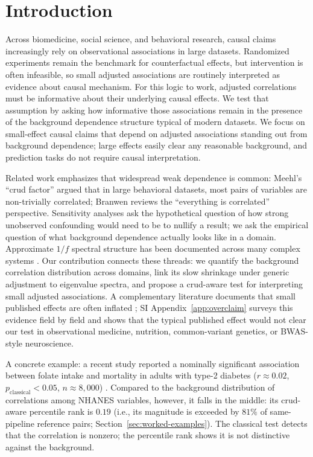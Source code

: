 \section{Introduction}

Across biomedicine, social science, and behavioral research, causal claims increasingly rely on observational associations in large datasets. Randomized experiments remain the benchmark for counterfactual effects, but intervention is often infeasible, so small adjusted associations are routinely interpreted as evidence about causal mechanism. For this logic to work, adjusted correlations must be informative about their underlying causal effects. We test that assumption by asking how informative those associations remain in the presence of the background dependence structure typical of modern datasets. We focus on small-effect causal claims that depend on adjusted associations standing out from background dependence; large effects easily clear any reasonable background, and prediction tasks do not require causal interpretation.

Related work emphasizes that widespread weak dependence is common: Meehl's ``crud factor'' \citep{meehl1990} argued that in large behavioral datasets, most pairs of variables are non-trivially correlated; Branwen \citep{gwernEverything} reviews the ``everything is correlated'' perspective. Sensitivity analyses \citep{cinelli2020,oster2019} ask the hypothetical question of how strong unobserved confounding would need to be to nullify a result; we ask the empirical question of what background dependence actually looks like in a domain. Approximate $1/f$ spectral structure has been documented across many complex systems \citep{press1978}. Our contribution connects these threads: we quantify the background correlation distribution across domains, link its slow shrinkage under generic adjustment to eigenvalue spectra, and propose a crud-aware test for interpreting small adjusted associations. A complementary literature documents that small published effects are often inflated \citep{ioannidis2005,gelman2014,osc2015}; SI Appendix~\ref{app:overclaim} surveys this evidence field by field and shows that the typical published effect would not clear our test in observational medicine, nutrition, common-variant genetics, or BWAS-style neuroscience.

A concrete example: a recent study reported a nominally significant association between folate intake and mortality in adults with type-2 diabetes ($r \approx 0.02$, $p_{\mathrm{classical}} < 0.05$, $n \approx 8{,}000$) \citep{liu2022}. Compared to the background distribution of correlations among NHANES variables, however, it falls in the middle: its crud-aware percentile rank is $0.19$ (i.e., its magnitude is exceeded by $81\%$ of same-pipeline reference pairs; Section~\ref{sec:worked-examples}). The classical test detects that the correlation is nonzero; the percentile rank shows it is not distinctive against the background.

